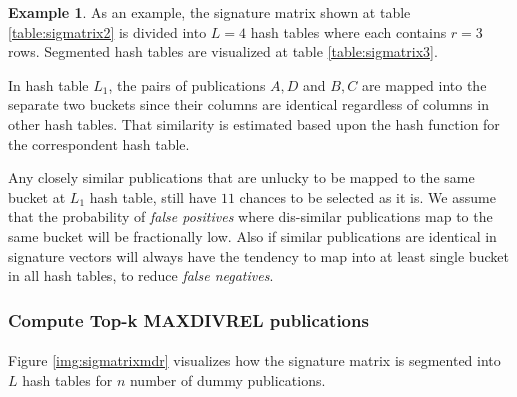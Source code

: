 \documentclass[a4paper,12pt,oneside]{book}
\theoremstyle{definition}
\newtheorem{example}{Example}[section]
\theoremstyle{remark}
\begin{document}
\begin{example}
As an example, the signature matrix shown at table \ref{table:sigmatrix2} is divided into $L=4$ hash tables where each contains $r=3$ rows. Segmented hash tables are visualized at table \ref{table:sigmatrix3}.

In hash table $L_1$, the pairs of publications $A,D$ and $B,C$ are mapped into the separate two buckets since their columns are identical regardless of columns in other hash tables. That similarity is estimated based upon the hash function for the correspondent hash table.

Any closely similar publications that are unlucky to be mapped to the same bucket at $L_1$ hash table, still have $11$ chances to be selected as it is. We assume that the probability of \emph{false positives} where dis-similar publications map to the same bucket will be fractionally low. Also if similar publications are identical in signature vectors will always have the tendency to map into at least single bucket in all hash tables, to reduce \emph{false negatives}.  
\end{example}

\subsubsection{Compute Top-k MAXDIVREL publications}
\paragraph*{}
Figure \ref{img:sigmatrixmdr} visualizes how the signature matrix is segmented into $L$ hash tables for $n$ number of dummy publications.
\end{document}
